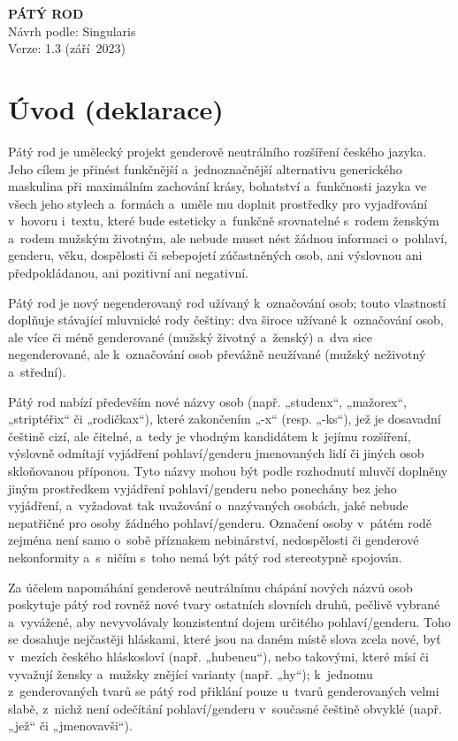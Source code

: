 \documentclass[10pt,draft]{article}
\begin{document}
\rmfamily%
%
%
\begin{center}%
{\Huge\bfseries PÁTÝ ROD\\}\medskip%
Návrh podle: Singularis\\%
Verze: 1.3 (září 2023)
\end{center}%
\bigskip%
%
\section{Úvod (deklarace)}

Pátý rod je umělecký projekt genderově neutrálního rozšíření českého jazyka.
Jeho cílem je přinést funkčnější a jedno\-značnější alternativu generického
maskulina při maximálním zachování krásy, bohatství a funkčnosti jazyka
ve všech jeho stylech a formách a uměle mu doplnit prostředky
pro vyjadřování v hovoru i textu, které bude esteticky
a funkčně srovnatelné s rodem ženským a rodem
mužským životným, ale nebude muset nést žádnou informaci o pohlaví, genderu,
věku, dospělosti či sebepojetí zúčastněných osob, ani výslovnou ani předpokládanou,
ani pozitivní ani negativní.

Pátý rod je nový negenderovaný rod užívaný k označování osob;
touto vlastností doplňuje stávající mluvnické rody češtiny:
dva široce užívané k označování osob, ale více či méně genderované
(mužský životný a ženský) a dva sice negenderované, ale k označování osob
převážně neužívané (mužský neživotný a střední).

Pátý rod nabízí především nové názvy osob (např. „studenx“, „mažorex“, „striptéřix“
či „rodičkax“), které zakončením „-x“ (resp. „-ks“), jež je dosavadní češtině cizí,
ale čitelné, a tedy je vhodným kandidátem k jejímu rozšíření, výslovně odmítají
vyjádření pohlaví/genderu jmenovaných lidí či jiných osob skloňovanou příponou.
Tyto názvy mohou být podle rozhodnutí mluvčí doplněny jiným prostředkem
vyjádření pohlaví/genderu nebo ponechány bez jeho vyjádření,
a vyžadovat tak uvažování o nazývaných osobách, jaké nebude nepatřičné
pro osoby žádného pohlaví/genderu. Označení osoby v pátém rodě
zejména není samo o sobě příznakem nebinárství, nedospělosti
či genderové nekonformity a s ničím s toho nemá být pátý rod stereotypně
spojován.

Za účelem napomáhání genderově neutrálnímu chápání nových názvů osob
poskytuje pátý rod rovněž nové tvary ostatních slovních druhů,
pečlivě vybrané a vyvážené, aby nevyvolávaly konzistentní dojem
určitého pohlaví/genderu. Toho se dosahuje nejčastěji hláskami,
které jsou na daném místě slova zcela nové, byť v mezích českého hláskosloví
(např. „hubeneu“), nebo takovými, které mísí či vyvažují žensky a mužsky znějící
varianty (např. „hy“); k jednomu z genderovaných tvarů se pátý rod přiklání
pouze u tvarů genderovaných velmi slabě, z nichž není odečítání pohlaví/genderu
v současné češtině obvyklé (např. „jež“ či „jmenovavši“).
\end{document}
